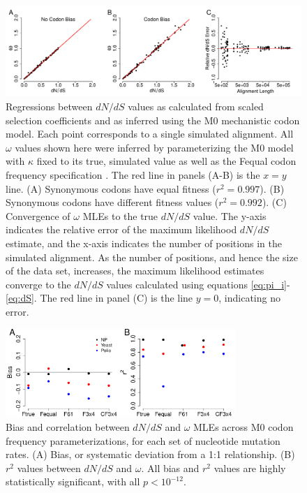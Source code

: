 \documentclass{pnastwo}
\begin{document}
\begin{figure}[htbp]
	\centerline{\includegraphics[width=18.7cm]{figures/MainText/regression_convergence.pdf}}
	\caption{\label{reg_conv} Regressions between $dN/dS$ values as calculated from scaled selection coefficients and as inferred using the M0 mechanistic codon model. Each point corresponds to a single simulated alignment. All $\omega$ values shown here were inferred by parameterizing the M0 model with $\kappa$ fixed to its true, simulated value as well as the Fequal codon frequency specification \cite{Yang2006}. The red line in panels (A-B) is the $x=y$ line. (A) Synonymous codons have equal fitness ($r^2=0.997$). (B) Synonymous codons have different fitness values ($r^2=0.992$). (C) Convergence of $\omega$ MLEs to the true $dN/dS$ value. The y-axis indicates the relative error of the maximum likelihood $dN/dS$ estimate, and the x-axis indicates the number of positions in the simulated alignment. As the number of positions, and hence the size of the data set, increases, the maximum likelihood estimates converge to the $dN/dS$ values calculated using equations \eqref{eq:pi_i}-\eqref{eq:dS}. The red line in panel (C) is the line $y=0$, indicating no error.}
\end{figure}
	
\vspace{2cm}
	

\begin{figure}[htbp]
	\centerline{\includegraphics[width=8.7cm]{figures/MainText/nyp_bias_r2.pdf}}
	\caption{\label{nyp_bias_r2} Bias and correlation between $dN/dS$ and $\omega$ MLEs across M0 codon frequency parameterizations, for each set of nucleotide mutation rates. (A) Bias, or systematic deviation from a 1:1 relationship. (B) $r^2$ values between $dN/dS$ and $\omega$. All bias and $r^2$ values are highly statistically significant, with all $p < 10^{-12}$.}
\end{figure}
	
\end{document}
